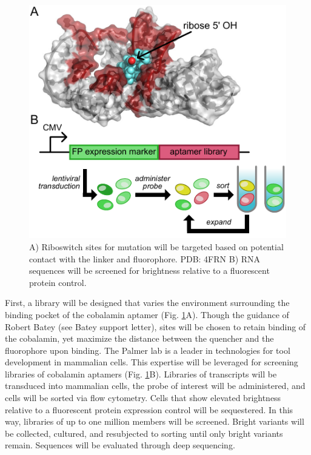 \begin{figure}
\begin{centering}
\includegraphics[width=\textwidth]{figures/aim2.pdf}

\end{centering}
\footnotesize
\caption{\label{figure:aim2}
A) Riboswitch sites for mutation will be targeted based on potential contact with the linker and fluorophore. PDB: 4FRN\cite{JohnsonJrB12cofactorsdirectly2012} B) RNA sequences will be screened for brightness relative to a fluorescent protein control.
}
\end{figure}

First, a library will be designed that varies the environment surrounding the binding pocket of the cobalamin aptamer (Fig. \ref{figure:aim2}A). Though the guidance of Robert Batey (see Batey support letter), sites will be chosen to retain binding of the cobalamin, yet maximize the distance between the quencher and the fluorophore upon binding.\cite{JohnsonJrB12cofactorsdirectly2012} The Palmer lab is a leader in technologies for tool development in mammalian cells.\cite{FiedlerDropletMicrofluidicFlow2017,DeanHighSpeedMultiparameterPhotophysical2015} This expertise will be leveraged for screening libraries of cobalamin aptamers (Fig. \ref{figure:aim2}B). Libraries of transcripts will be transduced into mammalian cells, the probe of interest will be administered, and cells will be sorted via flow cytometry. Cells that show elevated brightness relative to a fluorescent protein expression control will be sequestered.
In this way, libraries of up to one million members will be screened. Bright variants will be collected, cultured, and resubjected to sorting until only bright variants remain. Sequences will be evaluated through deep sequencing.

